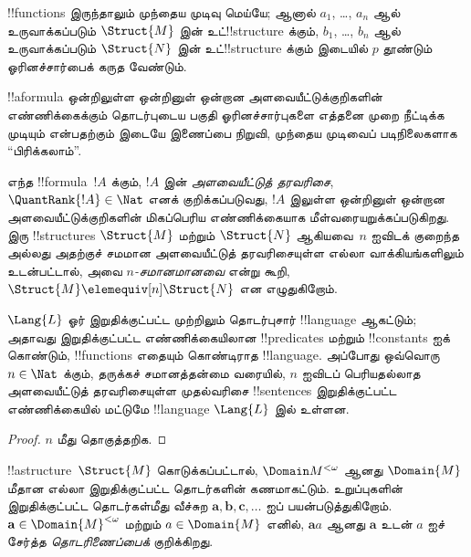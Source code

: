 \documentclass[../../../include/open-logic-section]{subfiles}
\begin{document}
\begin{rem}
!!{function}s இருந்தாலும் முந்தைய முடிவு மெய்யே; ஆனால் $a_1$, \dots,
$a_n$ ஆல் உருவாக்கப்படும் $\Struct{M}$ இன் உட்!!{structure} க்கும்,
$b_1$, \dots, $b_n$ ஆல் உருவாக்கப்படும் $\Struct{N}$ இன்
உட்!!{structure} க்கும் இடையில் $p$ தூண்டும் ஓரினச்சார்பைக் கருத வேண்டும்.
\end{rem}

!!a{formula} ஒன்றிலுள்ள ஒன்றினுள் ஒன்றான அளவையீட்டுக்குறிகளின்
எண்ணிக்கைக்கும் தொடர்புடைய பகுதி ஓரினச்சார்புகளை எத்தனை முறை நீட்டிக்க
முடியும் என்பதற்கும் இடையே இணைப்பை நிறுவி, முந்தைய முடிவைப் படிநிலைகளாக
``பிரிக்கலாம்''.

\begin{defn}
  எந்த !!{formula}~$!A$ க்கும், $!A$ இன் \emph{அளவையீட்டுத்
  தரவரிசை}, $\QuantRank{!A} \in \Nat$ எனக் குறிக்கப்படுவது,
  $!A$ இலுள்ள ஒன்றினுள் ஒன்றான அளவையீட்டுக்குறிகளின் மிகப்பெரிய
  எண்ணிக்கையாக மீள்வரையறுக்கப்படுகிறது. இரு !!{structure}s
  $\Struct{M}$ மற்றும் $\Struct{N}$ ஆகியவை~$n$ ஐவிடக் குறைந்த அல்லது
  அதற்குச் சமமான அளவையீட்டுத் தரவரிசையுள்ள எல்லா வாக்கியங்களிலும்
  உடன்பட்டால், அவை \emph{$n$-சமானமானவை} என்று கூறி,
  $\Struct{M} \elemequiv[n] \Struct{N}$ என எழுதுகிறோம்.
\end{defn}

\begin{prop}
  $\Lang{L}$ ஓர் இறுதிக்குட்பட்ட முற்றிலும் தொடர்புசார்
  !!{language} ஆகட்டும்; அதாவது இறுதிக்குட்பட்ட எண்ணிக்கையிலான
  !!{predicate}s மற்றும் !!{constant}s ஐக் கொண்டும், !!{function}s
  எதையும் கொண்டிராத !!{language}. அப்போது ஒவ்வொரு $n \in \Nat$
  க்கும், தருக்கச் சமானத்தன்மை வரையில், $n$ ஐவிடப் பெரியதல்லாத
  அளவையீட்டுத் தரவரிசையுள்ள முதல்வரிசை !!{sentence}s இறுதிக்குட்பட்ட
  எண்ணிக்கையில் மட்டுமே !!{language} $\Lang{L}$ இல் உள்ளன.
\end{prop}

\begin{proof}
  $n$ மீது தொகுத்தறிக.
\end{proof}

\begin{defn}
  !!a{structure}~$\Struct{M}$ கொடுக்கப்பட்டால், $\Domain M^{<\omega}$
  ஆனது $\Domain{M}$ மீதான எல்லா இறுதிக்குட்பட்ட தொடர்களின் கணமாகட்டும்.
  உறுப்புகளின் இறுதிக்குட்பட்ட தொடர்கள்மீது வீச்சுற
  $\mathbf{a}, \mathbf{b}, \mathbf{c}, \ldots$ ஐப் பயன்படுத்துகிறோம்.
  $\mathbf{a} \in \Domain{M}^{<\omega}$ மற்றும் $a \in \Domain{M}$
  எனில், $\mathbf{a}a$ ஆனது $\mathbf{a}$ உடன் $a$ ஐச் சேர்த்த
  \emph{தொடரிணைப்பைக்} குறிக்கிறது.
\end{defn}
\end{document}
